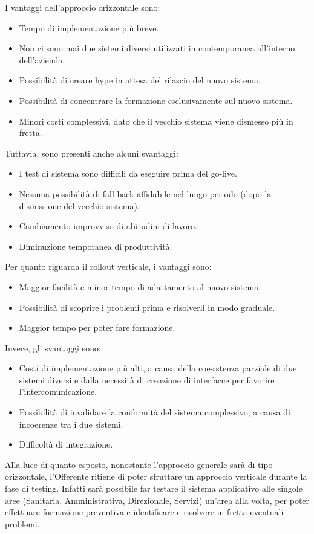             I vantaggi dell'approccio orizzontale sono:
            \begin{itemize}
            \item Tempo di implementazione più breve.
            \item Non ci sono mai due sistemi diversi utilizzati in contemporanea all'interno dell'azienda.
            \item Possibilità di creare hype in attesa del rilascio del nuovo sistema.
            \item Possibilità di concentrare la formazione esclusivamente sul nuovo sistema.
            \item Minori costi complessivi, dato che il vecchio sistema viene dismesso più in fretta.
            \end{itemize}
            Tuttavia, sono presenti anche alcuni svantaggi:
            \begin{itemize}
            \item I test di sistema sono difficili da eseguire prima del go-live.
            \item Nessuna possibilità di fall-back affidabile nel lungo periodo (dopo la dismissione del vecchio sistema).
            \item Cambiamento improvviso di abitudini di lavoro.
            \item Diminuzione temporanea di produttività.
            \end{itemize}
            Per quanto riguarda il rollout verticale, i vantaggi sono:
            \begin{itemize}
            \item Maggior facilità e minor tempo di adattamento al nuovo sistema.
            \item Possibilità di scoprire i problemi prima e risolverli in modo graduale.
            \item Maggior tempo per poter fare formazione.
            \end{itemize}
            Invece, gli svantaggi sono:
            \begin{itemize}
            \item Costi di implementazione più alti, a causa della coesistenza parziale di due sistemi diversi e dalla necessità di creazione di interfacce per favorire l'intercomunicazione.
            \item Possibilità di invalidare la conformità del sistema complessivo, a causa di incoerenze tra i due sistemi.
            \item Difficoltà di integrazione.
            \end{itemize}
            Alla luce di quanto esposto, nonostante l'approccio generale sarà di tipo orizzontale, l'Offerente ritiene di poter sfruttare un approccio verticale durante la fase di testing. Infatti sarà possibile far testare il sistema applicativo alle singole aree (Sanitaria, Amministrativa, Direzionale, Servizi) un'area alla volta, per poter effettuare formazione preventiva e identificare e risolvere in fretta eventuali problemi.
           
